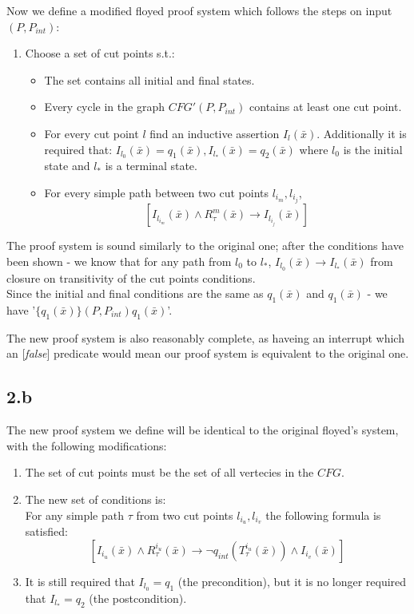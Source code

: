 \documentclass{article}
\begin{document}
Now we define a modified floyed proof system which follows the steps
on input $(P,P_{int})$:
\begin{enumerate}
    \item Choose a set of cut points s.t.:
    \begin{itemize}
        \item The set contains all initial and final states.
        \item Every cycle in the graph $CFG'(P,P_{int})$ contains at least one cut point.
        \item For every cut point $l$ find an inductive assertion $I_l(\bar{x})$.
            Additionally it is required that: $I_{l_0}(\bar{x}) = q_1(\bar{x}), I_{l_*}(\bar{x}) = q_2(\bar{x})$ where $l_0$
            is the initial state and $l_*$ is a terminal state.
        \item For every simple path between two cut points $l_{i_m}, l_{i_j}$,
        \[
            [I_{l_{i_m}}(\bar{x})\wedge R^m_\tau(\bar{x})\rightarrow I_{l_{i_j}}(\bar{x})]
        \]
    \end{itemize}
\end{enumerate}

The proof system is sound similarly to the original one; 
after the conditions have been shown - we know that for any path from
$l_0$ to $l_*$, $I_{l_0}(\bar{x})\rightarrow I_{l_*}(\bar{x})$ from closure on transitivity
of  the cut points conditions.\\
Since the initial and final conditions are the same as $q_1(\bar{x})$ and $q_1(\bar{x})$ -
we have '$\{q_1(\bar{x})\}(P,P_{int})q_1(\bar{x})$'.

The new proof system is also reasonably complete, as haveing an interrupt which an [\emph{false}]
predicate would mean our proof system is equivalent to the original one.

\subsection*{2.b}
The new proof system we define will be identical to the original floyed's system,
with the following modifications:
\begin{enumerate}
    \item The set of cut points must be the set of all vertecies in the $CFG$.
    \item The new set of conditions is:\\
    For any simple path $\tau$ from two cut points $l_{i_u}, l_{i_v}$ the following formula is satisfied:
    \[
        [I_{i_u}(\bar{x})\wedge R_\tau^{i_u}(\bar{x})\rightarrow \neg q_{int}(T_\tau^{i_u}(\bar{x}))\wedge I_{i_v}(\bar{x})]
    \]
    \item It is still required that $I_{l_0}=q_1$ (the precondition),
    but it is no longer required that $I_{l_*}=q_2$ (the postcondition).
\end{enumerate}
\end{document}

